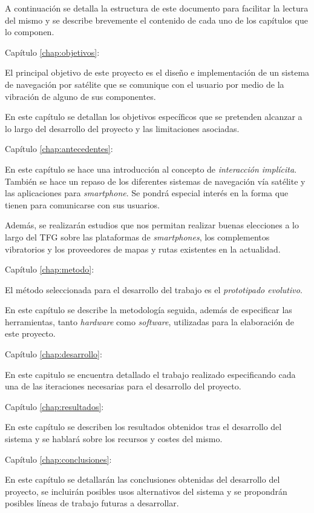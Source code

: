 A continuación se detalla la estructura de este documento para facilitar la lectura del mismo y
se describe brevemente el contenido de cada uno de los capítulos que lo componen.

\begin{definitionlist}
  \item[Capítulo \ref{chap:objetivos}: \nameref{chap:objetivos}] 

  El principal objetivo de este proyecto es el diseño e implementación de un sistema de navegación
  por satélite que se comunique con el usuario por medio de la vibración de alguno de sus
  componentes.

  En este capítulo se detallan los objetivos específicos que se pretenden alcanzar a lo largo
  del desarrollo del proyecto y las limitaciones asociadas.

  \item[Capítulo \ref{chap:antecedentes}: \nameref{chap:antecedentes}]

  En este capítulo se hace una introducción al concepto de \emph{interacción implícita}. También se
  hace un repaso de los diferentes sistemas de navegación vía satélite y las aplicaciones para
  \emph{smartphone}. Se pondrá especial interés en la forma que tienen para comunicarse con sus
  usuarios.

  Además, se realizarán estudios que nos permitan realizar buenas elecciones a lo largo del
  \acs{TFG} sobre las plataformas de \emph{smartphones}, los complementos vibratorios y los
  proveedores de mapas y rutas existentes en la actualidad.

  \item[Capítulo \ref{chap:metodo}: \nameref{chap:metodo}]

  El método seleccionada para el desarrollo del trabajo es el \emph{prototipado evolutivo}.

  En este capítulo se describe la metodología seguida, además de especificar las herramientas, tanto
  \emph{hardware} como \emph{software}, utilizadas para la elaboración de este proyecto.

  \item[Capítulo \ref{chap:desarrollo}: \nameref{chap:desarrollo}]

  En este capitulo se encuentra detallado el trabajo realizado especificando cada una de las
  iteraciones necesarias para el desarrollo del proyecto.

  \item[Capítulo \ref{chap:resultados}: \nameref{chap:resultados}]

  En este capítulo se describen los resultados obtenidos tras el desarrollo del sistema y se hablará
  sobre los recursos y costes del mismo.

  \item[Capítulo \ref{chap:conclusiones}: \nameref{chap:conclusiones}]

  En este capítulo se detallarán las conclusiones obtenidas del desarrollo del proyecto, se
  incluirán posibles usos alternativos del sistema y se propondrán posibles líneas de trabajo
  futuras a desarrollar.

\end{definitionlist}

